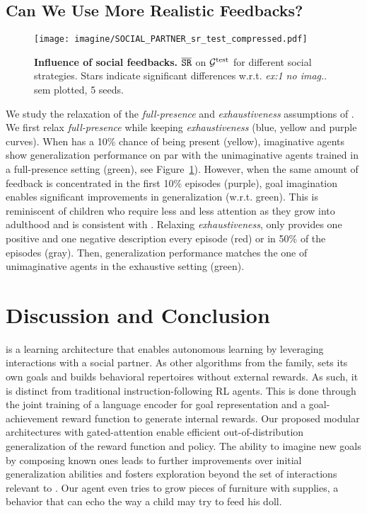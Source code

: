 \subsection{Can We Use More Realistic Feedbacks?}
%
\label{sec:social_feedbacks}
\begin{figure}
\centering
\vspace{-.3cm}
     \texttt{[image: imagine/SOCIAL\_PARTNER\_sr\_test\_compressed.pdf]}
     \vspace{-0.5cm}
        \caption{\textbf{Influence of social feedbacks.} $\overline{\mathtt{SR}}$ on $\mathcal{G}^\text{test}$ for different social strategies. Stars indicate significant differences w.r.t. \textit{ex:1 no imag.}. sem plotted, 5 seeds.}
      \label{fig:social}
\end{figure}
We study the relaxation of the \textit{full-presence} and \textit{exhaustiveness} assumptions of \SP. We first relax \textit{full-presence} while keeping \textit{exhaustiveness} (blue, yellow and purple curves). When \SP has a 10\% chance of being present (yellow), imaginative agents show generalization performance on par with the unimaginative agents trained in a full-presence setting (green), see Figure~\ref{fig:social}). However, when the same amount of feedback is concentrated in the first 10\% episodes (purple), goal imagination enables significant improvements in generalization (w.r.t. green).  This is reminiscent of children who require less and less attention as they grow into adulthood and is consistent with \citet{chan2019actrce}. Relaxing \textit{exhaustiveness}, \SP only provides one positive and one negative description every episode (red) or in 50\% of the episodes (gray). Then, generalization performance matches the one of unimaginative agents in the exhaustive setting (green). 

\section{Discussion and Conclusion}
\imagine is a learning architecture that enables autonomous learning by leveraging \NL interactions with a social partner. As other algorithms from the \imgep family, \imagine sets its own goals and builds behavioral repertoires without external rewards. As such, it is distinct from traditional instruction-following RL agents. This is done through the joint training of a language encoder for goal representation and a goal-achievement reward function to generate internal rewards. Our proposed modular architectures with gated-attention enable efficient out-of-distribution generalization of the reward function and policy. The ability to imagine new goals by composing known ones leads to further improvements over initial generalization abilities and fosters exploration beyond the set of interactions relevant to \SP. Our agent even tries to grow pieces of furniture with supplies, a behavior that can echo the way a child may try to feed his doll. 

